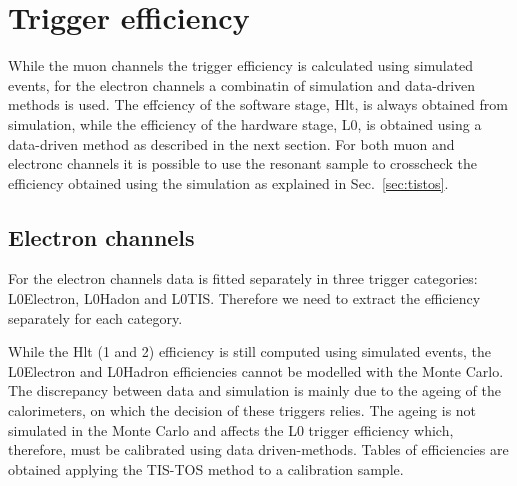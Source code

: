 \section{Trigger efficiency}
\label{sec:RKst_trigger_eff}

While the muon channels the trigger efficiency is calculated using simulated events,
for the electron channels a combinatin of simulation and data-driven methods is used.
The effciency of the software stage, Hlt, is always obtained from simulation,
while the efficiency of the hardware stage, L0, is obtained using a data-driven method
as described in the next section.
For both muon and electronc channels it is possible to use the resonant sample to crosscheck
the efficiency obtained using the simulation as explained in Sec.~\ref{sec:tistos}.

\subsection{Electron channels}

For the electron channels data is fitted separately in three trigger categories: L0Electron, L0Hadon and L0TIS.
Therefore we need to extract the efficiency separately for each category.

While the Hlt (1 and 2) efficiency is still computed using simulated events,
the L0Electron and L0Hadron efficiencies cannot be modelled with the Monte Carlo.
The discrepancy between data and simulation is mainly due to the ageing of the 
calorimeters, on which the decision of these triggers relies. The ageing is not simulated
in the Monte Carlo and affects the L0 trigger efficiency which, therefore, must
be calibrated using data driven-methods. Tables of efficiencies are obtained
applying the TIS-TOS method to a calibration sample.

